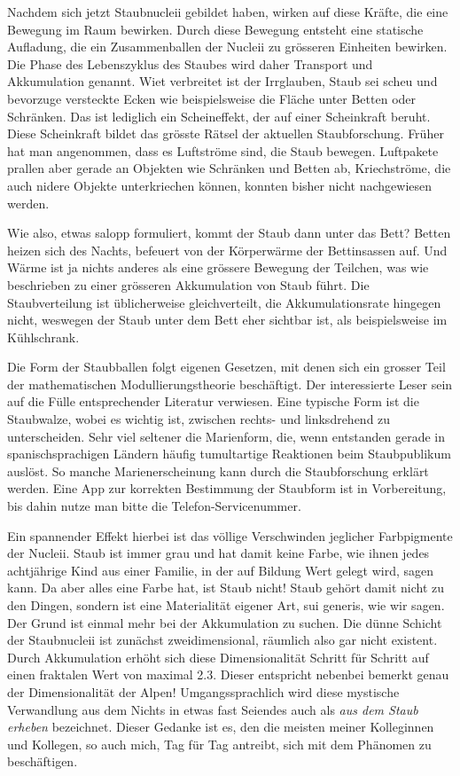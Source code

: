 Nachdem sich jetzt Staubnucleii gebildet haben, wirken auf diese Kräfte, die eine Bewegung im Raum bewirken. Durch diese Bewegung entsteht eine statische Aufladung, die ein Zusammenballen der Nucleii zu grösseren Einheiten bewirken. Die Phase des Lebenszyklus des Staubes wird daher Transport und Akkumulation genannt. Wiet verbreitet ist der Irrglauben, Staub sei scheu und bevorzuge versteckte Ecken wie beispielsweise die Fläche unter Betten oder Schränken. Das ist lediglich ein Scheineffekt, der auf einer Scheinkraft beruht. Diese Scheinkraft bildet das grösste Rätsel der aktuellen Staubforschung. Früher hat man angenommen, dass es Luftströme sind, die Staub bewegen. Luftpakete prallen aber gerade an Objekten wie Schränken und Betten ab, Kriechströme, die auch nidere Objekte unterkriechen können, konnten bisher nicht nachgewiesen werden.

Wie also, etwas salopp formuliert, kommt der Staub dann unter das Bett? Betten heizen sich des Nachts, befeuert von der Körperwärme der Bettinsassen auf. Und Wärme ist ja nichts anderes als eine grössere Bewegung der Teilchen, was wie beschrieben zu einer grösseren Akkumulation von Staub führt. Die Staubverteilung ist üblicherweise gleichverteilt, die Akkumulationsrate hingegen nicht, weswegen der Staub unter dem Bett eher sichtbar ist, als beispielsweise im Kühlschrank.

Die Form der Staubballen folgt eigenen Gesetzen, mit denen sich ein grosser Teil der mathematischen Modullierungstheorie beschäftigt. Der interessierte Leser sein auf die Fülle entsprechender Literatur verwiesen. Eine typische Form ist die Staubwalze, wobei es wichtig ist, zwischen rechts- und linksdrehend zu unterscheiden. Sehr viel seltener die Marienform, die, wenn entstanden gerade in spanischsprachigen Ländern häufig tumultartige Reaktionen beim Staubpublikum auslöst. So manche Marienerscheinung kann durch die Staubforschung erklärt werden. Eine App zur korrekten Bestimmung der Staubform ist in Vorbereitung, bis dahin nutze man bitte die Telefon-Servicenummer.

Ein spannender Effekt hierbei ist das völlige Verschwinden jeglicher Farbpigmente der Nucleii. Staub ist immer grau und hat damit keine Farbe, wie ihnen jedes achtjährige Kind aus einer Familie, in der auf Bildung Wert gelegt wird, sagen kann. Da aber alles eine Farbe hat, ist Staub nicht! Staub gehört damit nicht zu den Dingen, sondern ist eine Materialität eigener Art, sui generis, wie wir sagen. Der Grund ist einmal mehr bei der Akkumulation zu suchen. Die dünne Schicht der Staubnucleii ist zunächst zweidimensional, räumlich also gar nicht existent. Durch Akkumulation erhöht sich diese Dimensionalität Schritt für Schritt auf einen fraktalen Wert von maximal 2.3. Dieser entspricht nebenbei bemerkt genau der Dimensionalität der Alpen! Umgangssprachlich wird diese mystische Verwandlung aus dem Nichts in etwas fast Seiendes auch als \textit{aus dem Staub erheben} bezeichnet. Dieser Gedanke ist es, den die meisten meiner Kolleginnen und Kollegen, so auch mich, Tag für Tag antreibt, sich mit dem Phänomen zu beschäftigen.

